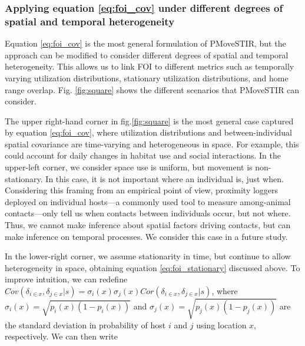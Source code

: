\documentclass[letterpaper]{article}
\begin{document}
\subsubsection*{Applying equation \ref{eq:foi_cov} under different degrees of spatial and temporal heterogeneity}

Equation \ref{eq:foi_cov} is the most general formulation of PMoveSTIR, but the approach can be modified to consider different degrees of spatial and temporal heterogeneity. This allows us to link FOI to different metrics such as temporally varying utilization distributions, stationary utilization distributions, and home range overlap. Fig. \ref{fig:square} shows the different scenarios that PMoveSTIR can consider. 

The upper right-hand corner in fig.\ref{fig:square} is the most general case captured by equation \ref{eq:foi_cov}, where utilization distributions and between-individual spatial covariance are time-varying and heterogeneous in space. For example, this could account for daily changes in habitat use and social interactions. 
In the upper-left corner, we consider space use is uniform, but movement is non-stationary. In this case, it is not important where an individual is, just when. Considering this framing from an empirical point of view, proximity loggers deployed on individual hosts---a commonly used tool to measure among-animal contacts---only tell us when contacts between individuals occur, but not where.  Thus, we cannot make inference about spatial factors driving contacts, but can make inference on temporal processes.  We consider this case in a future study.

In the lower-right corner, we assume stationarity in time, but continue to allow heterogeneity in space, obtaining equation \ref{eq:foi_stationary} discussed above.  To improve intuition, we can redefine $Cov(\delta_{i \in x}, \delta_{j \in x} | s) = \sigma_i(x) \sigma_j(x) Cor(\delta_{i \in x}, \delta_{j \in x} | s)$, where $\sigma_i(x) = \sqrt{p_i(x)(1 - p_i(x))}$  and $\sigma_j(x) = \sqrt{p_j(x)(1 - p_j(x))}$ are the standard deviation in probability of host $i$ and $j$ using location $x$, respectively.  We can then write
\end{document}
